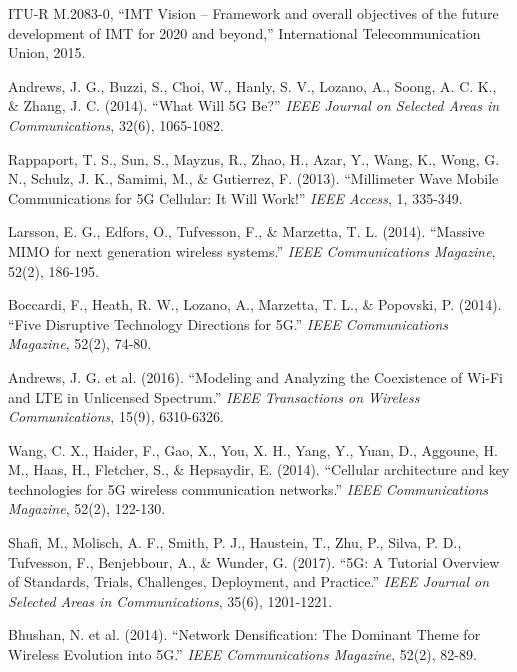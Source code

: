 \documentclass[journal]{IEEEtran}
\begin{document}
\begin{thebibliography}{1}

  ITU-R M.2083-0, ``IMT Vision – Framework and overall objectives of the future development of IMT for 2020 and beyond,'' International Telecommunication Union, 2015.
  
  Andrews, J. G., Buzzi, S., Choi, W., Hanly, S. V., Lozano, A., Soong, A. C. K., \& Zhang, J. C. (2014). ``What Will 5G Be?'' \textit{IEEE Journal on Selected Areas in Communications}, 32(6), 1065-1082.
  
  Rappaport, T. S., Sun, S., Mayzus, R., Zhao, H., Azar, Y., Wang, K., Wong, G. N., Schulz, J. K., Samimi, M., \& Gutierrez, F. (2013). ``Millimeter Wave Mobile Communications for 5G Cellular: It Will Work!'' \textit{IEEE Access}, 1, 335-349.
  
  Larsson, E. G., Edfors, O., Tufvesson, F., \& Marzetta, T. L. (2014). ``Massive MIMO for next generation wireless systems.'' \textit{IEEE Communications Magazine}, 52(2), 186-195.
  
  Boccardi, F., Heath, R. W., Lozano, A., Marzetta, T. L., \& Popovski, P. (2014). ``Five Disruptive Technology Directions for 5G.'' \textit{IEEE Communications Magazine}, 52(2), 74-80.
  
  Andrews, J. G. et al. (2016). ``Modeling and Analyzing the Coexistence of Wi-Fi and LTE in Unlicensed Spectrum.'' \textit{IEEE Transactions on Wireless Communications}, 15(9), 6310-6326.
  
  Wang, C. X., Haider, F., Gao, X., You, X. H., Yang, Y., Yuan, D., Aggoune, H. M., Haas, H., Fletcher, S., \& Hepsaydir, E. (2014). ``Cellular architecture and key technologies for 5G wireless communication networks.'' \textit{IEEE Communications Magazine}, 52(2), 122-130.
  
  Shafi, M., Molisch, A. F., Smith, P. J., Haustein, T., Zhu, P., Silva, P. D., Tufvesson, F., Benjebbour, A., \& Wunder, G. (2017). ``5G: A Tutorial Overview of Standards, Trials, Challenges, Deployment, and Practice.'' \textit{IEEE Journal on Selected Areas in Communications}, 35(6), 1201-1221.
  
  Bhushan, N. et al. (2014). ``Network Densification: The Dominant Theme for Wireless Evolution into 5G.'' \textit{IEEE Communications Magazine}, 52(2), 82-89.
  

\end{thebibliography}
\end{document}
